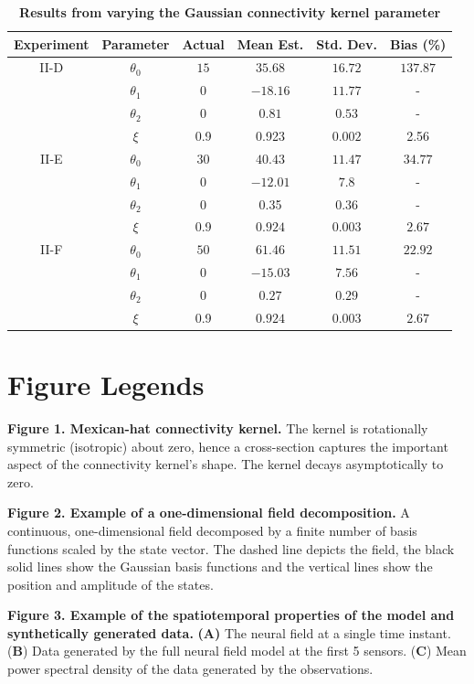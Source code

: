 \documentclass[5p,authoryear]{elsarticle}
\begin{document}
\clearpage
\newpage
\begin{table}[!ht]
\begin{tabular}{c|ccccc}
	Experiment & Parameter & Actual & Mean Est. & Std. Dev. & Bias (\%) \\ \hline
	II-D &$\theta_0$ & $15$ & $35.68$ & $16.72$ & $137.87$ \\
	& $\theta_1$ & 0 & $-18.16$ & $11.77$ & - \\
	& $\theta_2$ & 0 & $0.81$ & $0.53$ & - \\
	& $\xi$ & 0.9 & 0.923 & $0.002$ & 2.56 \\ \hline	
	
 	II-E& $\theta_0$ & $30$ & $40.43$ & $11.47$ & $34.77$ \\
	& $\theta_1$ & 0 & $-12.01$ & $7.8$ & - \\
	& $\theta_2$ & 0 & 0.35 & $0.36$ & - \\
	& $\xi$ & 0.9 & $0.924$ & $0.003$ & $2.67$ \\ \hline
	
	II-F & $\theta_0$ & $50$ & $61.46$ & $11.51$ & $22.92$ \\
	& $\theta_1$ & 0 & $-15.03$ & $7.56$ & - \\
	& $\theta_2$ & 0 & $0.27$ & $0.29$ & - \\
	& $\xi$ & 0.9 & $0.924$ & $0.003$ & $2.67$ \\ \hline
\end{tabular}\label{tab:GaussianKernelResults}
\caption{\textbf{Results from varying the Gaussian connectivity kernel parameter}}
\end{table}

\newpage
\clearpage
\section*{Figure Legends}
{\bf Figure 1. Mexican-hat connectivity kernel.} The kernel is rotationally symmetric (isotropic) about zero, hence a cross-section captures the important aspect of the connectivity kernel's shape. The kernel decays asymptotically to zero.

{\bf Figure 2. Example of a one-dimensional field decomposition.} A continuous, one-dimensional field decomposed by a finite number of basis functions scaled by the state vector. The dashed line depicts the field, the black solid lines show the Gaussian basis functions and the vertical lines show the position and amplitude of the states.

{\bf Figure 3. Example of the spatiotemporal properties of the model and synthetically generated data.} \textbf{(A)} The neural field at a single time instant. (\textbf{B}) Data generated by the full neural field model at the first 5 sensors. (\textbf{C}) Mean power spectral density of the data generated by the observations.
\end{document}

